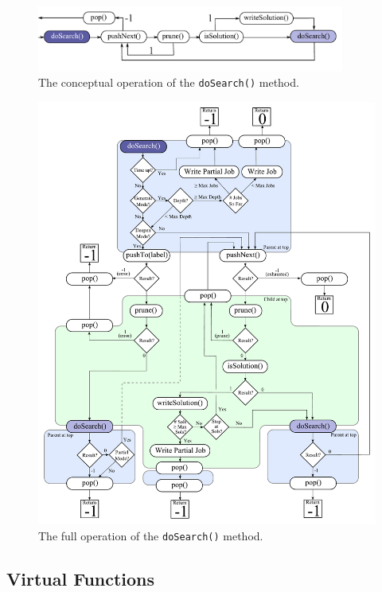 \documentclass[11pt]{article}
\begin{document}
	
\begin{figure}[h]
	\centering
	\includegraphics[width=0.9\textwidth]{figures/conceptFlowchart}
	\caption{\label{fig:doSearchSmall}The conceptual operation of the \texttt{doSearch()} method.}
\end{figure}
	
\begin{figure}[p]
	\centering
	\includegraphics[height=0.95\textheight]{figures/doSearchFlowchart}
	\caption{\label{fig:doSearch}The full operation of the \texttt{doSearch()} method.}
\end{figure}

\subsection{Virtual Functions}
\end{document}
